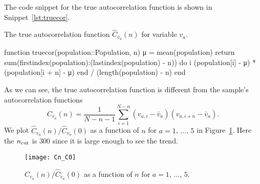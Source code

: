 \Answer{}
The code snippet for the true autocorrelation function is shown in Snippet~\ref{lst:truecor}.
%
\begin{algorithm}
    \caption{The true autocorrelation function $\hat{C}_{v_a}(n)$ for variable $v_a$.}
    \label{lst:truecor}
    \begin{juliacode}
        function truecor(population::Population, n)
            μ = mean(population)
            return sum(firstindex(population):(lastindex(population) - n)) do i
                (population[i] - μ) * (population[i + n] - μ)
            end / (length(population) - n)
        end
    \end{juliacode}
\end{algorithm}
%
As we can see, the true autocorrelation function is different from the sample's
autocorrelation functions
%
\begin{equation}
    C_{v_a}(n) = \frac{ 1 }{ N - n - 1 }
    \sum_{i=1}^{N-n} (v_{a,i} - \bar{v}_a) (v_{a,i + n} - \bar{v}_a).
\end{equation}
%
We plot $\hat{C}_{v_a}(n) / \hat{C}_{v_a}(0)$ as a function of $n$ for $a = 1$, $\ldots$,
$5$ in Figure~\ref{fig:truecor}.
Here the $n_\textnormal{cut}$ is $300$ since it is large enough to see the trend.

\begin{figure}[h]
    \centering
    \texttt{[image: Cn\_C0]}
    \caption{$\hat{C}_{v_a}(n) / \hat{C}_{v_a}(0)$ as a function of $n$ for
        $a = 1$, $\ldots$, $5$.}
    \label{fig:truecor}
\end{figure}
